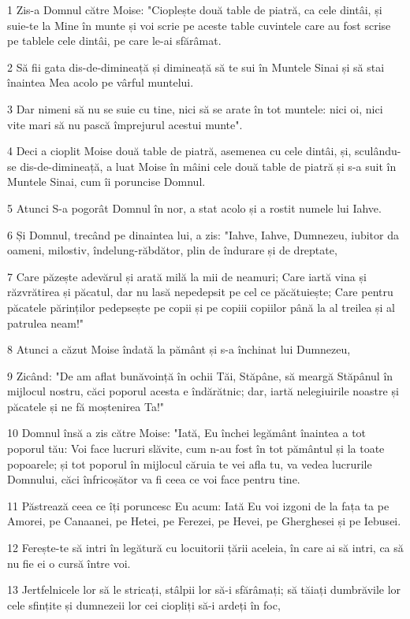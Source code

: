 \par 1 Zis-a Domnul către Moise: "Cioplește două table de piatră, ca cele dintâi, și suie-te la Mine în munte și voi scrie pe aceste table cuvintele care au fost scrise pe tablele cele dintâi, pe care le-ai sfărâmat.
\par 2 Să fii gata dis-de-dimineață și dimineață să te sui în Muntele Sinai și să stai înaintea Mea acolo pe vârful muntelui.
\par 3 Dar nimeni să nu se suie cu tine, nici să se arate în tot muntele: nici oi, nici vite mari să nu pască împrejurul acestui munte".
\par 4 Deci a cioplit Moise două table de piatră, asemenea cu cele dintâi, și, sculându-se dis-de-dimineață, a luat Moise în mâini cele două table de piatră și s-a suit în Muntele Sinai, cum îi poruncise Domnul.
\par 5 Atunci S-a pogorât Domnul în nor, a stat acolo și a rostit numele lui Iahve.
\par 6 Și Domnul, trecând pe dinaintea lui, a zis: "Iahve, Iahve, Dumnezeu, iubitor da oameni, milostiv, îndelung-răbdător, plin de îndurare și de dreptate,
\par 7 Care păzește adevărul și arată milă la mii de neamuri; Care iartă vina și răzvrătirea și păcatul, dar nu lasă nepedepsit pe cel ce păcătuiește; Care pentru păcatele părinților pedepsește pe copii și pe copiii copiilor până la al treilea și al patrulea neam!"
\par 8 Atunci a căzut Moise îndată la pământ și s-a închinat lui Dumnezeu,
\par 9 Zicând: "De am aflat bunăvoință în ochii Tăi, Stăpâne, să meargă Stăpânul în mijlocul nostru, căci poporul acesta e îndărătnic; dar, iartă nelegiuirile noastre și păcatele și ne fă moștenirea Ta!"
\par 10 Domnul însă a zis către Moise: "Iată, Eu închei legământ înaintea a tot poporul tău: Voi face lucruri slăvite, cum n-au fost în tot pământul și la toate popoarele; și tot poporul în mijlocul căruia te vei afla tu, va vedea lucrurile Domnului, căci înfricoșător va fi ceea ce voi face pentru tine.
\par 11 Păstrează ceea ce îți poruncesc Eu acum: Iată Eu voi izgoni de la fața ta pe Amorei, pe Canaanei, pe Hetei, pe Ferezei, pe Hevei, pe Gherghesei și pe Iebusei.
\par 12 Ferește-te să intri în legătură cu locuitorii țării aceleia, în care ai să intri, ca să nu fie ei o cursă între voi.
\par 13 Jertfelnicele lor să le stricați, stâlpii lor să-i sfărâmați; să tăiați dumbrăvile lor cele sfințite și dumnezeii lor cei ciopliți să-i ardeți în foc,
